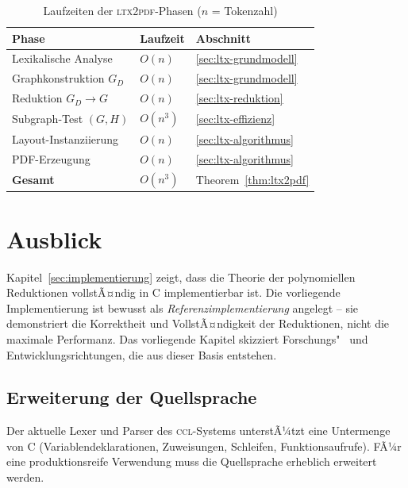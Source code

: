 ﻿\documentclass[a4paper,12pt]{article}
\theoremstyle{definition}
\begin{document}
\begin{table}[h!]
	\centering
	\renewcommand{\arraystretch}{1.4}
	\begin{tabular}{|l|l|l|}
		\hline
		\textbf{Phase} & \textbf{Laufzeit} & \textbf{Abschnitt} \\
		\hline
		Lexikalische Analyse         & $O(n)$   & \ref{sec:ltx-grundmodell} \\
		Graphkonstruktion $G_D$      & $O(n)$   & \ref{sec:ltx-grundmodell} \\
		Reduktion $G_D \to G$        & $O(n)$   & \ref{sec:ltx-reduktion}   \\
		Subgraph-Test $(G, H)$       & $O(n^3)$ & \ref{sec:ltx-effizienz}   \\
		Layout-Instanziierung        & $O(n)$   & \ref{sec:ltx-algorithmus} \\
		PDF-Erzeugung                & $O(n)$   & \ref{sec:ltx-algorithmus} \\
		\hline
		\textbf{Gesamt}              & $O(n^3)$ & Theorem~\ref{thm:ltx2pdf} \\
		\hline
	\end{tabular}
	\caption{Laufzeiten der \textsc{ltx2pdf}-Phasen ($n$ = Tokenzahl)}
	\label{tab:ltx-laufzeit}
\end{table}


\section{Ausblick}
\label{sec:ausblick-impl}

Kapitel~\ref{sec:implementierung} zeigt, dass die Theorie der polynomiellen
Reduktionen vollstÃ¤ndig in C implementierbar ist. Die vorliegende
Implementierung ist bewusst als \emph{Referenzimplementierung} angelegt --
sie demonstriert die Korrektheit und VollstÃ¤ndigkeit der Reduktionen,
nicht die maximale Performanz. Das vorliegende Kapitel skizziert
Forschungs"~ und Entwicklungsrichtungen, die aus dieser Basis entstehen.

\subsection{Erweiterung der Quellsprache}
\label{sec:ausblick-sprache}

Der aktuelle Lexer und Parser des \textsc{ccl}-Systems unterstÃ¼tzt eine
Untermenge von C (Variablendeklarationen, Zuweisungen, Schleifen,
Funktionsaufrufe). FÃ¼r eine produktionsreife Verwendung muss die
Quellsprache erheblich erweitert werden.
\end{document}
